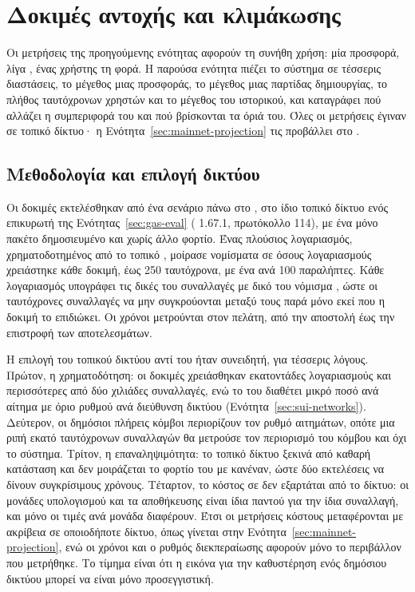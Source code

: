 \section{Δοκιμές αντοχής και κλιμάκωσης}
\label{sec:stress}

Οι μετρήσεις της προηγούμενης ενότητας αφορούν τη συνήθη χρήση: μία προσφορά, λίγα
, ένας χρήστης τη φορά. Η παρούσα ενότητα πιέζει το σύστημα σε τέσσερις
διαστάσεις, το μέγεθος μιας προσφοράς, το μέγεθος μιας παρτίδας δημιουργίας, το πλήθος
ταυτόχρονων χρηστών και το μέγεθος του ιστορικού, και καταγράφει πού αλλάζει η
συμπεριφορά του και πού βρίσκονται τα όριά του. Όλες οι μετρήσεις έγιναν σε τοπικό
δίκτυο· η Ενότητα~\ref{sec:mainnet-projection} τις προβάλλει στο .

\subsection{Μεθοδολογία και επιλογή δικτύου}
\label{sec:stress-method}

Οι δοκιμές εκτελέσθηκαν από ένα σενάριο  πάνω στο , στο ίδιο
τοπικό δίκτυο ενός επικυρωτή της Ενότητας~\ref{sec:gas-eval} ( 1.67.1,
πρωτόκολλο 114), με ένα μόνο πακέτο δημοσιευμένο και χωρίς άλλο φορτίο. Ένας πλούσιος
λογαριασμός, χρηματοδοτημένος από το τοπικό , μοίρασε νομίσματα σε όσους
λογαριασμούς χρειάστηκε κάθε δοκιμή, έως 250 ταυτόχρονα, με ένα  ανά 100
παραλήπτες. Κάθε λογαριασμός υπογράφει τις δικές του συναλλαγές με δικό του νόμισμα
, ώστε οι ταυτόχρονες συναλλαγές να μην συγκρούονται μεταξύ τους παρά μόνο εκεί
που η δοκιμή το επιδιώκει. Οι χρόνοι μετρούνται στον πελάτη, από την αποστολή έως την
επιστροφή των αποτελεσμάτων.

Η επιλογή του τοπικού δικτύου αντί του  ήταν συνειδητή, για τέσσερις λόγους.
Πρώτον, η χρηματοδότηση: οι δοκιμές χρειάσθηκαν εκατοντάδες λογαριασμούς και περισσότερες
από δύο χιλιάδες συναλλαγές, ενώ το  του  διαθέτει μικρό ποσό ανά
αίτημα με όριο ρυθμού ανά διεύθυνση δικτύου (Ενότητα~\ref{sec:sui-networks}). Δεύτερον,
οι δημόσιοι πλήρεις κόμβοι περιορίζουν τον ρυθμό αιτημάτων, οπότε μια ριπή εκατό
ταυτόχρονων συναλλαγών θα μετρούσε τον περιορισμό του κόμβου και όχι το σύστημα. Τρίτον,
η επαναληψιμότητα: το τοπικό δίκτυο ξεκινά από καθαρή κατάσταση και δεν μοιράζεται το
φορτίο του με κανέναν, ώστε δύο εκτελέσεις να δίνουν συγκρίσιμους χρόνους. Τέταρτον, το
κόστος σε  δεν εξαρτάται από το δίκτυο: οι μονάδες υπολογισμού και τα 
αποθήκευσης είναι ίδια παντού για την ίδια συναλλαγή, και μόνο οι τιμές ανά μονάδα
διαφέρουν. Έτσι οι μετρήσεις κόστους μεταφέρονται με ακρίβεια σε οποιοδήποτε δίκτυο,
όπως γίνεται στην Ενότητα~\ref{sec:mainnet-projection}, ενώ οι χρόνοι και ο ρυθμός
διεκπεραίωσης αφορούν μόνο το περιβάλλον που μετρήθηκε. Το τίμημα είναι ότι η εικόνα
για την καθυστέρηση ενός δημόσιου δικτύου μπορεί να είναι μόνο προσεγγιστική.

